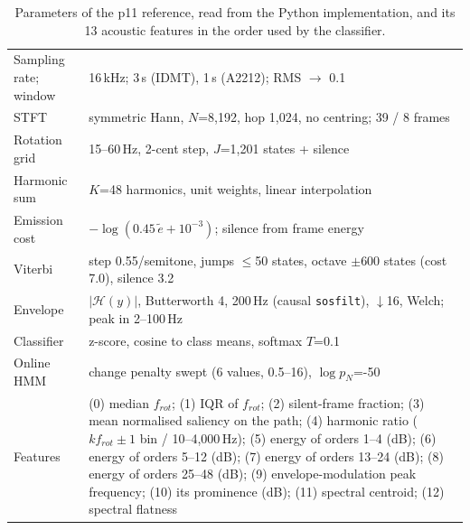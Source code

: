
\begin{table}[t]
\centering
\scriptsize
\setlength{\tabcolsep}{3pt}
\caption{Parameters of the p11 reference, read from the Python implementation, and its 13 acoustic features in the order used by the classifier.}
\label{tab:params}
\begin{tabular}{@{}p{1.55cm}p{6.6cm}@{}}
\toprule
Sampling rate; window & 16\,kHz; 3\,s (IDMT), 1\,s (A2212); RMS $\rightarrow$ 0.1 \\
STFT & symmetric Hann, $N$=8{,}192, hop 1{,}024, no centring; 39 / 8 frames \\
Rotation grid & 15--60\,Hz, 2-cent step, $J$=1{,}201 states + silence \\
Harmonic sum & $K$=48 harmonics, unit weights, linear interpolation \\
Emission cost & $-\log(0.45\,\tilde e + \ensuremath{10^{-3}})$; silence from frame energy \\
Viterbi & step 0.55/semitone, jumps $\le$50 states, octave $\pm$600 states (cost 7.0), silence 3.2 \\
Envelope & $|\mathcal{H}(y)|$, Butterworth 4, 200\,Hz (causal \texttt{sosfilt}), $\downarrow$16, Welch; peak in 2--100\,Hz \\
Classifier & z-score, cosine to class means, softmax $T$=0.1 \\
Online HMM & change penalty swept (6 values, 0.5--16), $\log p_N$=-50 \\
\midrule
Features & (0) median $f_{rot}$; (1) IQR of $f_{rot}$; (2) silent-frame fraction; (3) mean normalised saliency on the path; (4) harmonic ratio ($k f_{rot}\pm1$ bin / 10--4{,}000\,Hz); (5) energy of orders 1--4 (dB); (6) energy of orders 5--12 (dB); (7) energy of orders 13--24 (dB); (8) energy of orders 25--48 (dB); (9) envelope-modulation peak frequency; (10) its prominence (dB); (11) spectral centroid; (12) spectral flatness \\
\bottomrule
\end{tabular}
\end{table}
